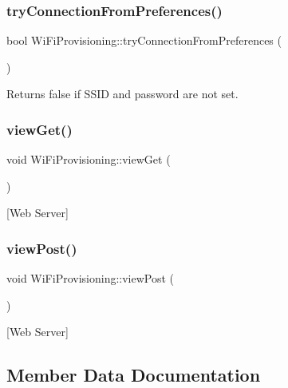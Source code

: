 \subsubsection{\texorpdfstring{try\+Connection\+From\+Preferences()}{tryConnectionFromPreferences()}}
{\footnotesize\ttfamily bool Wi\+Fi\+Provisioning\+::try\+Connection\+From\+Preferences (\begin{DoxyParamCaption}{ }\end{DoxyParamCaption})\hspace{0.3cm}{\ttfamily [private]}}

Returns false if S\+S\+ID and password are not set. \mbox{\label{class_wi_fi_provisioning_a3d0b39ab0ec9cf3260e82d19c471d0fe}} 
\subsubsection{\texorpdfstring{view\+Get()}{viewGet()}}
{\footnotesize\ttfamily void Wi\+Fi\+Provisioning\+::view\+Get (\begin{DoxyParamCaption}{ }\end{DoxyParamCaption})\hspace{0.3cm}{\ttfamily [private]}}

\mbox{[}Web Server\mbox{]} \mbox{\label{class_wi_fi_provisioning_ac27fd34f6f6dd317f2fba2d4bb7e609e}} 
\subsubsection{\texorpdfstring{view\+Post()}{viewPost()}}
{\footnotesize\ttfamily void Wi\+Fi\+Provisioning\+::view\+Post (\begin{DoxyParamCaption}{ }\end{DoxyParamCaption})\hspace{0.3cm}{\ttfamily [private]}}

\mbox{[}Web Server\mbox{]} 

\subsection{Member Data Documentation}
\mbox{\label{class_wi_fi_provisioning_a1a54c3ca59fb3c3cc9c0762a90ac19b8}} 
